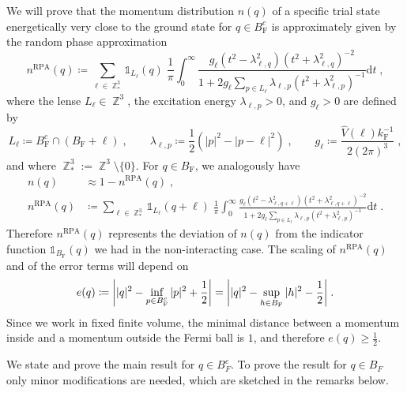 \documentclass[12pt,a4paper]{article}
\numberwithin{equation}{section}
\newcommand{\1}{\mathbb{I}}
\newcommand{\F}{\mathrm{F}}
\newcommand{\RPA}{\mathrm{RPA}}
\DeclareMathOperator{\Z}{\mathbb{Z}}
\newcommand{\half}{\frac{1}{2}}
\theoremstyle{plain}
\theoremstyle{definition}
\theoremstyle{remark}
\theoremstyle{plain}
\theoremstyle{definition}
\theoremstyle{remark}
\begin{document}
We will prove that the momentum distribution $ n(q) $ of a specific trial state energetically very close to the ground state for $ q \in B_{\F}^c $ is approximately given by the random phase approximation
\begin{equation} \label{eq:nqb}
	n^{\RPA}(q)
	\coloneq \sum_{\ell \in \Z^3_*}\mathds{1}_{L_{\ell}}(q) \; \frac{1}{\pi}\int_0^\infty \frac{g_\ell (t^2-\lambda^2_{\ell,q}) (t^2 + \lambda^2_{\ell,q})^{-2}}{1 + 2g_\ell \sum_{p \in L_{\ell}}\lambda_{\ell,p} (t^2+\lambda^2_{\ell,p})^{-1}} \mathrm{d}t \;,
\end{equation}
where the lense $ L_\ell \in \Z^3 $, the excitation energy $ \lambda_{\ell,p} > 0 $, and $ g_\ell > 0 $ are defined by
\begin{equation} \label{eq:Lell}
	L_\ell \coloneq B_{\F}^c \cap (B_{\F} + \ell) \;, \qquad
	\lambda_{\ell,p} \coloneq \half (|p|^2 - |p-\ell|^2) \;, \qquad
	g_\ell \coloneq \frac{\hat{V}(\ell) k_{\F}^{-1}}{2 (2 \pi)^3} \;,
\end{equation}
and where $ \Z^3_* := \Z^3 \setminus \{0\} $. For $ q \in B_{\F} $, we analogously have
\begin{equation}
\begin{split}
	n(q) & \approx 1 - n^{\RPA}(q) \;, \\
	n^{\RPA}(q) & 	\coloneq \sum_{\ell \in \Z^3_*}\mathds{1}_{L_{\ell}}(q+\ell) \; \frac{1}{\pi}\int_0^\infty \frac{g_\ell (t^2-\lambda^2_{\ell,q+\ell}) (t^2 + \lambda^2_{\ell,q+\ell})^{-2}}{1 + 2g_\ell \sum_{p \in L_{\ell}}\lambda_{\ell,p} (t^2+\lambda^2_{\ell,p})^{-1}} \mathrm{d}t \;.
\end{split}
\end{equation}
Therefore $ n^{\RPA}(q) $ represents the deviation of $ n(q) $ from the indicator function $ \mathds{1}_{B_{\F}}(q) $ we had in the non-interacting case. The scaling of $ n^{\RPA}(q) $ and of the error terms will depend on
\begin{equation} \label{eq:eq}
	e(q)
	\coloneq \abs{|q|^2 - \inf_{p \in B_{\F}^c} |p|^2 + \half}
	= \abs{|q|^2 - \sup_{h \in B_{\F}} |h|^2 - \half} \;.
\end{equation}
Since we work in fixed finite volume, the minimal distance between a momentum inside and a momentum outside the Fermi ball is $1$, and therefore $ e(q) \ge \half $.

We state and prove the main result for $q \in B_F^c$. To prove the result for $q \in B_F$ only minor modifications are needed, which are sketched in the remarks below.
\end{document}
